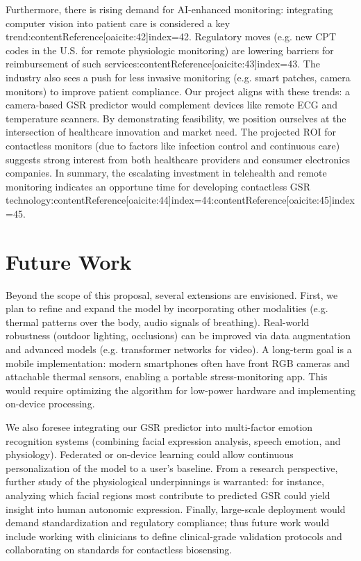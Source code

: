 \documentclass[12pt]{article}
\begin{document}
    Furthermore, there is rising demand for AI-enhanced monitoring: integrating computer vision into patient care is considered a key trend:contentReference[oaicite:42]{index=42}. Regulatory moves (e.g. new CPT codes in the U.S. for remote physiologic monitoring) are lowering barriers for reimbursement of such services:contentReference[oaicite:43]{index=43}. The industry also sees a push for less invasive monitoring (e.g. smart patches, camera monitors) to improve patient compliance. Our project aligns with these trends: a camera-based GSR predictor would complement devices like remote ECG and temperature scanners. By demonstrating feasibility, we position ourselves at the intersection of healthcare innovation and market need. The projected ROI for contactless monitors (due to factors like infection control and continuous care) suggests strong interest from both healthcare providers and consumer electronics companies. In summary, the escalating investment in telehealth and remote monitoring indicates an opportune time for developing contactless GSR technology:contentReference[oaicite:44]{index=44}:contentReference[oaicite:45]{index=45}.


    \section{Future Work}
    Beyond the scope of this proposal, several extensions are envisioned. First, we plan to refine and expand the model by incorporating other modalities (e.g. thermal patterns over the body, audio signals of breathing). Real-world robustness (outdoor lighting, occlusions) can be improved via data augmentation and advanced models (e.g. transformer networks for video). A long-term goal is a mobile implementation: modern smartphones often have front RGB cameras and attachable thermal sensors, enabling a portable stress-monitoring app. This would require optimizing the algorithm for low-power hardware and implementing on-device processing.

    We also foresee integrating our GSR predictor into multi-factor emotion recognition systems (combining facial expression analysis, speech emotion, and physiology). Federated or on-device learning could allow continuous personalization of the model to a user’s baseline. From a research perspective, further study of the physiological underpinnings is warranted: for instance, analyzing which facial regions most contribute to predicted GSR could yield insight into human autonomic expression. Finally, large-scale deployment would demand standardization and regulatory compliance; thus future work would include working with clinicians to define clinical-grade validation protocols and collaborating on standards for contactless biosensing.
\end{document}
